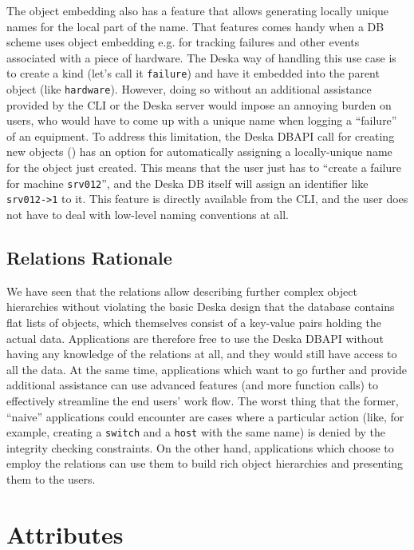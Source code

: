 \documentclass{article}
\begin{document}
The object embedding also has a feature that allows generating locally unique names for the local part of the name.
That features comes handy when a DB scheme uses object embedding e.g. for tracking failures and other events associated
with a piece of hardware.  The Deska way of handling this use case is to create a kind (let's call it {\tt failure}) and
have it embedded into the parent object (like {\tt hardware}).  However, doing so without an additional assistance
provided by the CLI or the Deska server would impose an annoying burden on users, who would have to come up with a
unique name when logging a ``failure'' of an equipment.  To address this limitation, the Deska DBAPI call for creating
new objects () has an option for automatically assigning a locally-unique name for the object
just created.  This means that the user just has to ``create a failure for machine {\tt srv012}'', and the Deska DB
itself will assign an identifier like {\tt srv012->1} to it.  This feature is directly available from the CLI, and the
user does not have to deal with low-level naming conventions at all.

\subsection{Relations Rationale}

We have seen that the relations allow describing further complex object hierarchies without violating the basic Deska
design that the database contains flat lists of objects, which themselves consist of a key-value pairs holding the
actual data.  Applications are therefore free to use the Deska DBAPI without having any knowledge of the relations at
all, and they would still have access to all the data.  At the same time, applications which want to go further and
provide additional assistance can use advanced features (and more function calls) to effectively streamline the end
users' work flow.  The worst thing that the former, ``naive'' applications could encounter are cases where a particular
action (like, for example, creating a {\tt switch} and a {\tt host} with the same name) is denied by the integrity
checking constraints.  On the other hand, applications which choose to employ the relations can use them to build rich
object hierarchies and presenting them to the users.

\section{Attributes}
\end{document}

